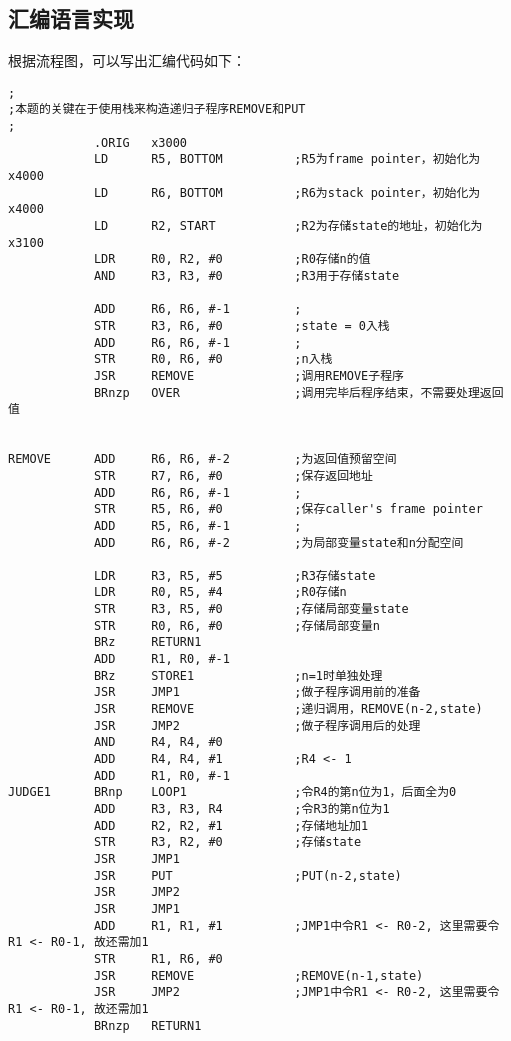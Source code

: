 \documentclass{article}
\begin{document}
\subsection{汇编语言实现}
根据流程图，可以写出汇编代码如下：
\begin{lstlisting}
;
;本题的关键在于使用栈来构造递归子程序REMOVE和PUT
;
            .ORIG   x3000
            LD      R5, BOTTOM          ;R5为frame pointer，初始化为x4000
            LD      R6, BOTTOM          ;R6为stack pointer，初始化为x4000
            LD      R2, START           ;R2为存储state的地址，初始化为x3100
            LDR     R0, R2, #0          ;R0存储n的值
            AND     R3, R3, #0          ;R3用于存储state

            ADD     R6, R6, #-1         ;
            STR     R3, R6, #0          ;state = 0入栈
            ADD     R6, R6, #-1         ;
            STR     R0, R6, #0          ;n入栈
            JSR     REMOVE              ;调用REMOVE子程序
            BRnzp   OVER                ;调用完毕后程序结束，不需要处理返回值
            
            
REMOVE      ADD     R6, R6, #-2         ;为返回值预留空间
            STR     R7, R6, #0          ;保存返回地址
            ADD     R6, R6, #-1         ;
            STR     R5, R6, #0          ;保存caller's frame pointer
            ADD     R5, R6, #-1         ;
            ADD     R6, R6, #-2         ;为局部变量state和n分配空间
            
            LDR     R3, R5, #5          ;R3存储state
            LDR     R0, R5, #4          ;R0存储n
            STR     R3, R5, #0          ;存储局部变量state
            STR     R0, R6, #0          ;存储局部变量n
            BRz     RETURN1             
            ADD     R1, R0, #-1         
            BRz     STORE1              ;n=1时单独处理
            JSR     JMP1                ;做子程序调用前的准备
            JSR     REMOVE              ;递归调用，REMOVE(n-2,state)
            JSR     JMP2                ;做子程序调用后的处理
            AND     R4, R4, #0
            ADD     R4, R4, #1          ;R4 <- 1
            ADD     R1, R0, #-1
JUDGE1      BRnp    LOOP1               ;令R4的第n位为1，后面全为0
            ADD     R3, R3, R4          ;令R3的第n位为1
            ADD     R2, R2, #1          ;存储地址加1
            STR     R3, R2, #0          ;存储state
            JSR     JMP1
            JSR     PUT                 ;PUT(n-2,state)
            JSR     JMP2
            JSR     JMP1
            ADD     R1, R1, #1          ;JMP1中令R1 <- R0-2, 这里需要令R1 <- R0-1, 故还需加1
            STR     R1, R6, #0
            JSR     REMOVE              ;REMOVE(n-1,state)
            JSR     JMP2                ;JMP1中令R1 <- R0-2, 这里需要令R1 <- R0-1, 故还需加1
            BRnzp   RETURN1
                       

\end{lstlisting}
\end{document}
